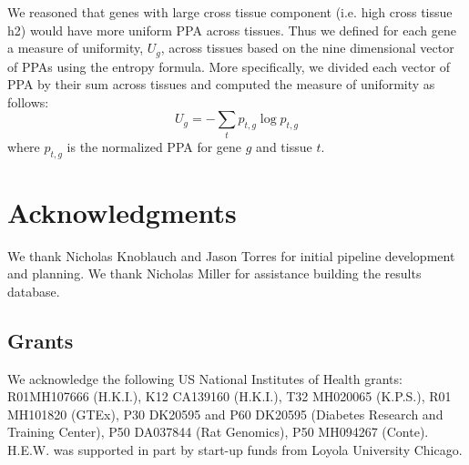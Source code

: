\documentclass[10pt,letterpaper]{article}
\begin{document}
We reasoned that genes with large cross tissue component (i.e. high cross tissue h2) would have more uniform PPA across tissues. Thus we defined for each gene a measure of uniformity, $U_g$, across tissues based on the nine dimensional vector of PPAs using the entropy formula. More specifically, we divided each vector of PPA by their sum across tissues and computed the measure of uniformity as follows:
\[ U_g = -\sum_{t}p_{t,g} \log p_{t,g} \]
%
where \(p_{t,g}\) is the normalized PPA for gene $g$ and tissue $t$.




\section*{Acknowledgments}
We thank Nicholas Knoblauch and Jason Torres for initial pipeline
development and planning. We thank Nicholas Miller for assistance building
the results database.

\subsection*{Grants}\label{grants}

We acknowledge the following US National Institutes of Health grants:
R01MH107666 (H.K.I.), K12 CA139160 (H.K.I.), T32 MH020065 (K.P.S.), R01 MH101820 (GTEx), 
P30 DK20595 and P60 DK20595 (Diabetes Research and
Training Center), P50 DA037844 (Rat Genomics), P50 MH094267 (Conte). H.E.W. was
supported in part by start-up funds from Loyola University Chicago.
\end{document}

